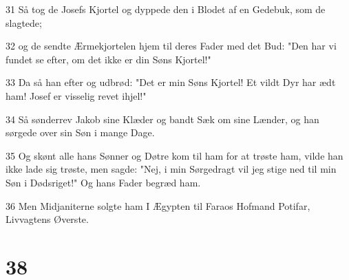 \par 31 Så tog de Josefs Kjortel og dyppede den i Blodet af en Gedebuk, som de slagtede;
\par 32 og de sendte Ærmekjortelen hjem til deres Fader med det Bud: "Den har vi fundet se efter, om det ikke er din Søns Kjortel!"
\par 33 Da så han efter og udbrød: "Det er min Søns Kjortel! Et vildt Dyr har ædt ham! Josef er visselig revet ihjel!"
\par 34 Så sønderrev Jakob sine Klæder og bandt Sæk om sine Lænder, og han sørgede over sin Søn i mange Dage.
\par 35 Og skønt alle hans Sønner og Døtre kom til ham for at trøste ham, vilde han ikke lade sig trøste, men sagde: "Nej, i min Sørgedragt vil jeg stige ned til min Søn i Dødsriget!" Og hans Fader begræd ham.
\par 36 Men Midjaniterne solgte ham I Ægypten til Faraos Hofmand Potifar, Livvagtens Øverste.

\chapter{38}

